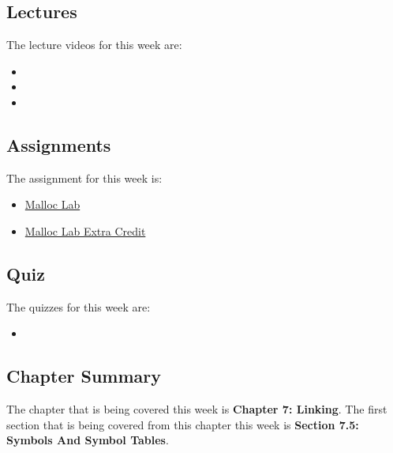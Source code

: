 \subsection{Lectures}

The lecture videos for this week are:

\begin{itemize}
    \item {}
    \item {}
    \item {}
\end{itemize}

\subsection{Assignments}

The assignment for this week is:

\begin{itemize}
    \item \href{https://github.com/QuantumCompiler/CU/tree/main/CSPB%202400%20-%20Computer%20Systems/CSPB%202400%20-%20Assignments/CSPB%202400%20-%20Assignment%206%20-%20Malloc%20Lab}{Malloc Lab}
    \item \href{https://github.com/QuantumCompiler/CU/tree/main/CSPB%202400%20-%20Computer%20Systems/CSPB%202400%20-%20Assignments/CSPB%202400%20-%20Assignment%206%20-%20Malloc%20Lab}{Malloc Lab Extra Credit}
\end{itemize}

\subsection{Quiz}

The quizzes for this week are:

\begin{itemize}
    \item {}
\end{itemize}

\subsection{Chapter Summary}

The chapter that is being covered this week is \textbf{Chapter 7: Linking}. The first section that is being covered from this chapter this week is \textbf{Section 7.5: Symbols And Symbol Tables}.

